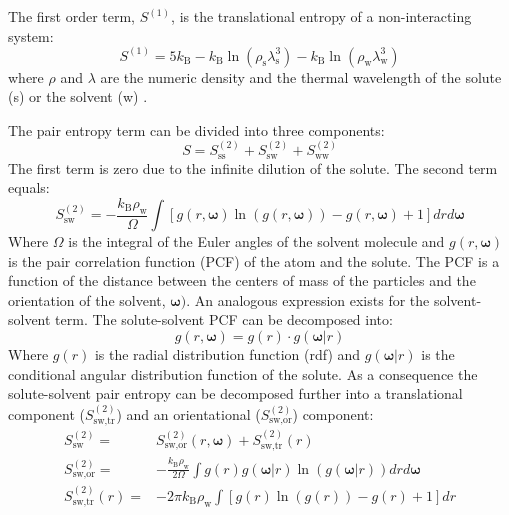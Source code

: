 The first order term, $S^{\left(1\right)}$, is the translational entropy of a non-interacting 
system: 
\begin{equation}
S^{\left(1\right)}=5k_\text{B}-k_\text{B}\ln 
\left(\rho_\text{s}\lambda_\text{s}^3\right)-k_\text{B}\ln\left(\rho_\text{w}\lambda_\text{w}
^3\right)
\end{equation}
where $\rho$ and $\lambda$ are the numeric density  and  the 
thermal 
wavelength of the solute (s) or the solvent (w) \cite{Lazaridis1996}.

The pair entropy term can be divided into three components:
\begin{equation}
S=S^{\left(2\right)}_\text{ss}+S^{\left(2\right)}_\text{sw}+S^{\left(2\right)}_\text{ww}
\end{equation}
The first term is zero due to the infinite dilution of the solute. The second term equals:
\begin{equation}
S^{\left(2\right)}_\text{sw}=-\frac{k_\text{B}\rho_\text{w}}{\Omega}\int 
\left[g(r,\boldsymbol{\omega})\ln\left(g(r,
\boldsymbol{\omega})\right)-g(r ,\boldsymbol{\omega})+1
\right]drd\boldsymbol{\omega}
\end{equation}
 Where $\Omega$ is the integral of the Euler angles of the solvent molecule and 
 $g(r,\boldsymbol{\omega})$ is the pair correlation function (PCF) of the atom and the solute. The 
PCF is a  function of the distance between the centers of mass of the particles and the 
orientation of the solvent, $\boldsymbol{\omega})$. An analogous expression exists for the 
solvent-solvent term. The solute-solvent PCF can be decomposed 
into\cite{Lazaridis1996}:
\begin{equation}
 g(r,\boldsymbol{\omega})=g(r)\cdot g(\boldsymbol{\omega}|r)
\end{equation}
Where $g(r)$ is the radial distribution function (\gls{rdf}) and $g(\boldsymbol{\omega}|r)$ is the 
conditional angular distribution function of the solute. As a consequence the solute-solvent 
pair 
entropy can be decomposed further into a translational component 
($S^{\left(2\right)}_\text{sw,tr}$) and an orientational 
($S^{\left(2\right)}_\text{sw,or}$)
component\cite{Lazaridis1996}:
\begin{align}
S^{\left(2\right)}_\text{sw}=&S^{\left(2\right)}_\text{sw,or}(r,\boldsymbol{\omega})+S^{
\left(2\right)}_\text{sw,tr
}(r)\\
S^{\left(2\right)}_\text{sw,or}=&-\frac{k_\text{B}\rho_\text{w}}{2\Omega}\int 
g(r)g(\boldsymbol{\omega}|r)\ln\left(g(\boldsymbol{\omega}|r)\right)drd\boldsymbol{\omega}\\
S^{\left(2\right)}_\text{sw,tr}(r)=&-2\pi k_\text{B}\rho_\text{w}\int 
\left[g(r)\ln\left(g(r)\right)-g(r)+1\right]dr
\end{align}

